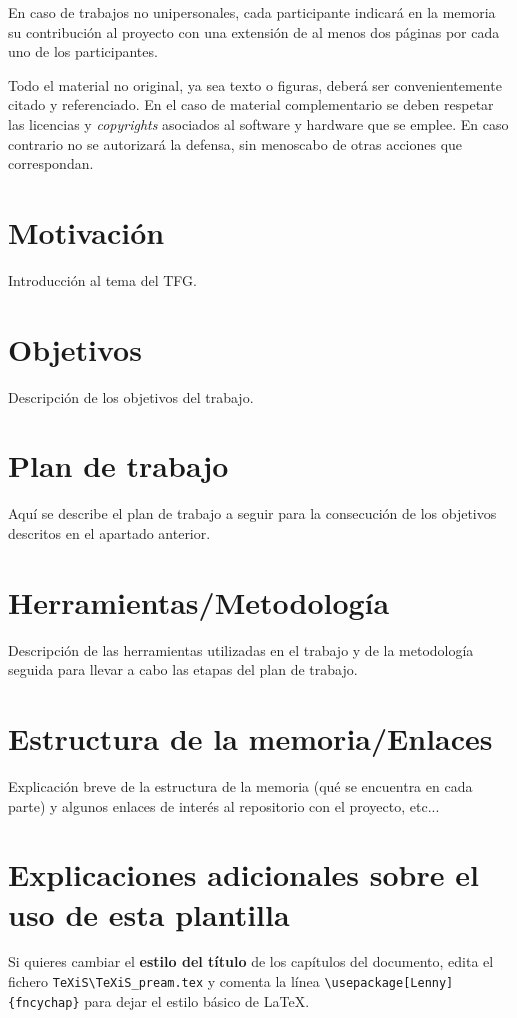 En caso de trabajos no unipersonales, cada participante indicará en la memoria su contribución al proyecto con una extensión de al menos dos páginas por cada uno de los participantes.

Todo el material no original, ya sea texto o figuras, deberá ser convenientemente citado y referenciado. En el caso de material complementario se deben respetar las licencias y \emph{copyrights} asociados al software y hardware que se emplee. En caso contrario no se autorizará la defensa, sin menoscabo de otras acciones que correspondan.


\section{Motivación}
Introducción al tema del TFG.


\section{Objetivos}
Descripción de los objetivos del trabajo.

\section{Plan de trabajo}
Aquí se describe el plan de trabajo a seguir para la consecución de los objetivos descritos en el apartado anterior.

\section{Herramientas/Metodología}
Descripción de las herramientas utilizadas en el trabajo y de la metodología seguida para llevar a cabo las etapas del plan de trabajo.

\section{Estructura de la memoria/Enlaces} 
Explicación breve de la estructura de la memoria (qué se encuentra en cada parte) y algunos enlaces de interés al repositorio con el proyecto, etc...



\section{Explicaciones adicionales sobre el uso de esta plantilla}
Si quieres cambiar el \textbf{estilo del título} de los capítulos del documento, edita el fichero \verb|TeXiS\TeXiS_pream.tex| y comenta la línea \verb|\usepackage[Lenny]{fncychap}| para dejar el estilo básico de \LaTeX.

